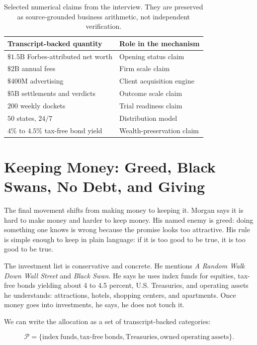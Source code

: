 \begin{table}
\centering
\begin{tabular}{|p{.43\linewidth}|p{.43\linewidth}|}
\hline
Transcript-backed quantity & Role in the mechanism\\
\hline
\(\$1.5\mathrm{B}\) Forbes-attributed net worth & Opening status claim\\
\hline
\(\$2\mathrm{B}\) annual fees & Firm scale claim\\
\hline
\(\$400\mathrm{M}\) advertising & Client acquisition engine\\
\hline
\(\$5\mathrm{B}\) settlements and verdicts & Outcome scale claim\\
\hline
\(200\) weekly dockets & Trial readiness claim\\
\hline
\(50\) states, \(24/7\) & Distribution model\\
\hline
\(4\%\) to \(4.5\%\) tax-free bond yield & Wealth-preservation claim\\
\hline
\end{tabular}
\caption{Selected numerical claims from the interview. They are preserved as source-grounded business arithmetic, not independent verification.}
\end{table}

\section{Keeping Money: Greed, Black Swans, No Debt, and Giving}

The final movement shifts from making money to keeping it. Morgan says it is hard to make money and harder to keep money. His named enemy is greed: doing something one knows is wrong because the promise looks too attractive. His rule is simple enough to keep in plain language: if it is too good to be true, it is too good to be true.

The investment list is conservative and concrete. He mentions \emph{A Random Walk Down Wall Street} and \emph{Black Swan}. He says he uses index funds for equities, tax-free bonds yielding about 4 to 4.5 percent, U.S. Treasuries, and operating assets he understands: attractions, hotels, shopping centers, and apartments. Once money goes into investments, he says, he does not touch it.

We can write the allocation as a set of transcript-backed categories:

\begin{equation}
\mathcal{P}
=
\{
\mathrm{index\ funds},
\mathrm{tax\mbox{-}free\ bonds},
\mathrm{Treasuries},
\mathrm{owned\ operating\ assets}
\}.
\end{equation}

